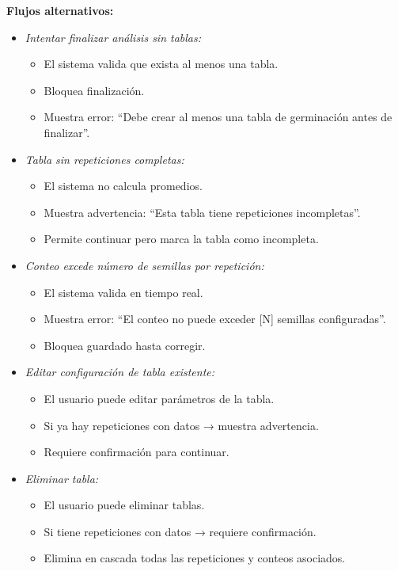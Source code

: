 \vspace{0.5em}
\noindent\textbf{Flujos alternativos:}
\begin{itemize}[nosep]
    \item \textit{Intentar finalizar análisis sin tablas:}
    \begin{itemize}[nosep]
        \item El sistema valida que exista al menos una tabla.
        \item Bloquea finalización.
        \item Muestra error: ``Debe crear al menos una tabla de germinación antes de finalizar''.
    \end{itemize}

    \item \textit{Tabla sin repeticiones completas:}
    \begin{itemize}[nosep]
        \item El sistema no calcula promedios.
        \item Muestra advertencia: ``Esta tabla tiene repeticiones incompletas''.
        \item Permite continuar pero marca la tabla como incompleta.
    \end{itemize}

    \item \textit{Conteo excede número de semillas por repetición:}
    \begin{itemize}[nosep]
        \item El sistema valida en tiempo real.
        \item Muestra error: ``El conteo no puede exceder [N] semillas configuradas''.
        \item Bloquea guardado hasta corregir.
    \end{itemize}

    \item \textit{Editar configuración de tabla existente:}
    \begin{itemize}[nosep]
        \item El usuario puede editar parámetros de la tabla.
        \item Si ya hay repeticiones con datos → muestra advertencia.
        \item Requiere confirmación para continuar.
    \end{itemize}

    \item \textit{Eliminar tabla:}
    \begin{itemize}[nosep]
        \item El usuario puede eliminar tablas.
        \item Si tiene repeticiones con datos → requiere confirmación.
        \item Elimina en cascada todas las repeticiones y conteos asociados.
    \end{itemize}
\end{itemize}

